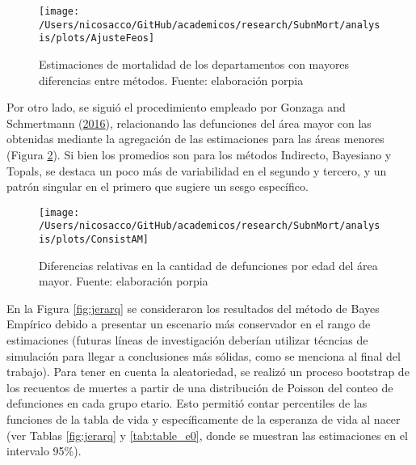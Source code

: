 \documentclass[12pt,]{article}
\begin{document}
\begin{figure}

{\centering \texttt{[image: /Users/nicosacco/GitHub/academicos/research/SubnMort/analysis/plots/AjusteFeos]} 

}

\caption{Estimaciones de mortalidad de los departamentos con mayores diferencias entre métodos. Fuente: elaboración porpia}\label{fig:Feos}
\end{figure}

Por otro lado, se siguió el procedimiento empleado por Gonzaga and
Schmertmann (\protect\hyperlink{ref-Gonzaga_Schmertmann_2016}{2016}),
relacionando las defunciones del área mayor con las obtenidas mediante
la agregación de las estimaciones para las áreas menores (Figura
\ref{fig:consistAM}). Si bien los promedios son para los métodos
Indirecto, Bayesiano y Topals, se destaca un poco más de variabilidad en
el segundo y tercero, y un patrón singular en el primero que sugiere un
sesgo específico.

\begin{figure}

{\centering \texttt{[image: /Users/nicosacco/GitHub/academicos/research/SubnMort/analysis/plots/ConsistAM]} 

}

\caption{Diferencias relativas en la cantidad de defunciones por edad del área mayor. Fuente: elaboración porpia}\label{fig:consistAM}
\end{figure}

En la Figura \ref{fig:jerarq} se consideraron los resultados del método
de Bayes Empírico debido a presentar un escenario más conservador en el
rango de estimaciones (futuras líneas de investigación deberían utilizar
técncias de simulación para llegar a conclusiones más sólidas, como se
menciona al final del trabajo). Para tener en cuenta la aleatoriedad, se
realizó un proceso bootstrap de los recuentos de muertes a partir de una
distribución de Poisson del conteo de defunciones en cada grupo etario.
Esto permitió contar percentiles de las funciones de la tabla de vida y
específicamente de la esperanza de vida al nacer (ver Tablas
\ref{fig:jerarq} y \ref{tab:table_e0}, donde se muestran las
estimaciones en el intervalo 95\%).
\end{document}
